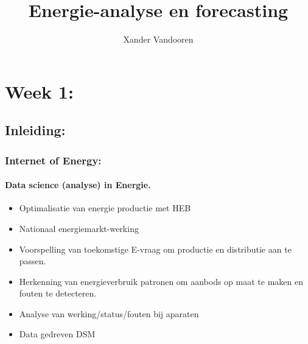 \documentclass[12pt]{article}
\begin{document}
\begin{titlepage}
    \author{Xander Vandooren}
    \title{Energie-analyse en
    forecasting}
\end{titlepage}
\maketitle
\newpage
\tableofcontents
\newpage
{}
\section{Week 1:}
\subsection{Inleiding:}
\subsubsection{Internet of Energy:}
\paragraph{Data science (analyse) in Energie.}
\begin{itemize}
    \item Optimalisatie van energie productie met HEB
    \item Nationaal energiemarkt-werking
    \item Voorspelling van toekomstige E-vraag om productie en distributie aan te passen. 
    \item Herkenning van energieverbruik patronen om aanbods op maat te maken en fouten te detecteren.
    \item Analyse van werking/status/fouten bij aparaten
    \item Data gedreven DSM
\end{itemize}
\end{document}

